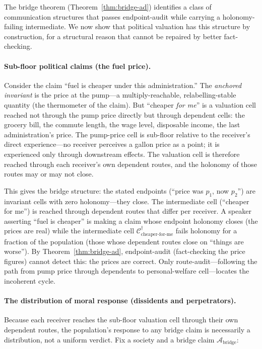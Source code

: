 \documentclass[twocolumn,11pt,a4paper]{article}
\theoremstyle{adv}
\theoremstyle{definition}
\theoremstyle{remark}
\newcommand{\Cell}{\mathcal{C}}        %
\newcommand{\Adv}{\mathcal{A}}        %
\begin{document}
The bridge theorem (Theorem~\ref{thm:bridge-ad}) identifies a class of
communication structures that passes endpoint-audit while carrying a
holonomy-failing intermediate. We now show that political valuation has this
structure by construction, for a structural reason that cannot be repaired by
better fact-checking.

\paragraph{Sub-floor political claims (the fuel price).}
Consider the claim ``fuel is cheaper under this administration.'' The
\emph{anchored invariant} is the price at the pump---a multiply-reachable,
relabelling-stable quantity (the thermometer of the claim). But ``cheaper
\emph{for me}'' is a valuation cell reached not through the pump price
directly but through dependent cells: the grocery bill, the commute length,
the wage level, disposable income, the last administration's price. The
pump-price cell is sub-floor relative to the receiver's direct
experience---no receiver perceives a gallon price as a point; it is
experienced only through downstream effects. The valuation cell is therefore
reached through each receiver's own dependent routes, and the holonomy of
those routes may or may not close.

This gives the bridge structure: the stated endpoints (``price was $p_1$,
now $p_2$'') are invariant cells with zero holonomy---they close. The
intermediate cell (``cheaper for me'') is reached through dependent routes
that differ per receiver. A speaker asserting ``fuel is cheaper'' is making
a claim whose endpoint holonomy closes (the prices are real) while the
intermediate cell $\Cell^\dagger_{\text{cheaper-for-me}}$ fails holonomy
for a fraction of the population (those whose dependent routes close on
``things are worse''). By Theorem~\ref{thm:bridge-ad}, endpoint-audit
(fact-checking the price figures) cannot detect this: the prices are
correct. Only route-audit---following the path from pump price through
dependents to personal-welfare cell---locates the incoherent cycle.

\paragraph{The distribution of moral response (dissidents and perpetrators).}
Because each receiver reaches the sub-floor valuation cell through their own
dependent routes, the population's response to any bridge claim is
necessarily a distribution, not a uniform verdict. Fix a society and a
bridge claim $\Adv_\mathrm{bridge}$:
\end{document}
